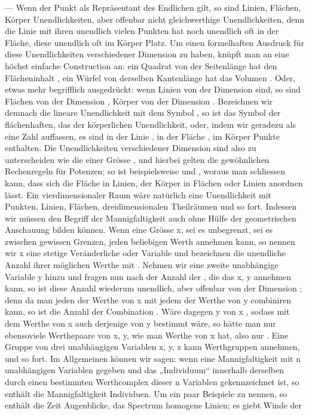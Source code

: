 — Wenn der Punkt als Repräsentant des Endlichen gilt, so sind Linien, Flächen, Körper Unendlichkeiten, aber offenbar nicht gleichwerthige Unendlichkeiten, denn die Linie mit ihren unendlich vielen Punkten hat noch unendlich oft in der Fläche, diese unendlich oft im Körper Platz. Um einen formelhaften Ausdruck für diese Unendlichkeiten verschiedener Dimension zu haben, knüpft man an eine höchst einfache Construction an: ein Quadrat von der Seitenlänge  hat den Flächeninhalt , ein Würfel von derselben Kantenlänge  hat das Volumen . Oder, etwas mehr begrifflich ausgedrückt: wenn Linien von der Dimension  sind, so sind Flächen von der Dimension , Körper von der Dimension . Bezeichnen wir demnach die lineare Unendlichkeit mit dem Symbol \Math{\infty}, so ist  das Symbol der flächenhaften,  das der körperlichen Unendlichkeit, oder, indem wir geradezu \Math{\infty} als eine Zahl auffassen, es sind in der Linie \Math{\infty}, in der Fläche , im Körper  Punkte enthalten. Die Unendlichkeiten verschiedener Dimension sind also zu unterscheiden wie die  einer Grösse \Math{\infty}, und hierbei gelten die gewöhnlichen Rechenregeln für Potenzen; so ist beispielsweise  und , woraus man schliessen kann, dass sich die Fläche in \Math{\infty} Linien, der Körper in \Math{\infty} Flächen oder  Linien anordnen lässt. Ein vierdimensionaler Raum wäre natürlich eine Unendlichkeit mit  Punkten,  Linien,  Flächen, \Math{\infty} dreidimensionalen Theilräumen und so fort. Indessen wir müssen den Begriff der Mannigfaltigkeit auch ohne Hülfe der geometrischen Anschauung bilden können. Wenn eine Grösse x, sei es unbegrenzt, sei es zwischen gewissen Grenzen, jeden beliebigen Werth annehmen kann, so nennen wir x eine stetige Veränderliche oder Variable und bezeichnen die unendliche Anzahl ihrer möglichen Werthe mit \Math{\infty}. Nehmen wir eine zweite unabhängige Variable y hinzu und fragen nun nach der Anzahl der , die das  x, y annehmen kann, so ist diese Anzahl wiederum unendlich, aber offenbar von der Dimension ; denn da man jeden der \Math{\infty} Werthe von x mit jedem der \Math{\infty} Werthe von y combiniren kann, so ist die Anzahl der Combination . Wäre dagegen y von x , sodass mit dem Werthe von x auch derjenige von y bestimmt wäre, so hätte man nur ebensoviele Werthepaare von x, y, wie man Werthe von x hat, also nur \Math{\infty}. Eine Gruppe von drei unabhängigen Variablen x, y, z kann  Werthgruppen annehmen, und so fort. Im Allgemeinen können wir sagen: wenn eine Mannigfaltigkeit mit n unabhängigen Variablen gegeben und das „Individuum“ innerhalb derselben durch einen bestimmten Werthcomplex dieser n Variablen gekennzeichnet ist, so enthält die Mannigfaltigkeit  Individuen. Um ein paar Beispiele zu nennen, so enthält die Zeit \Math{\infty} Augenblicke, das Spectrum \Math{\infty} homogene Linien; es giebt \Math{\infty} Winde der 